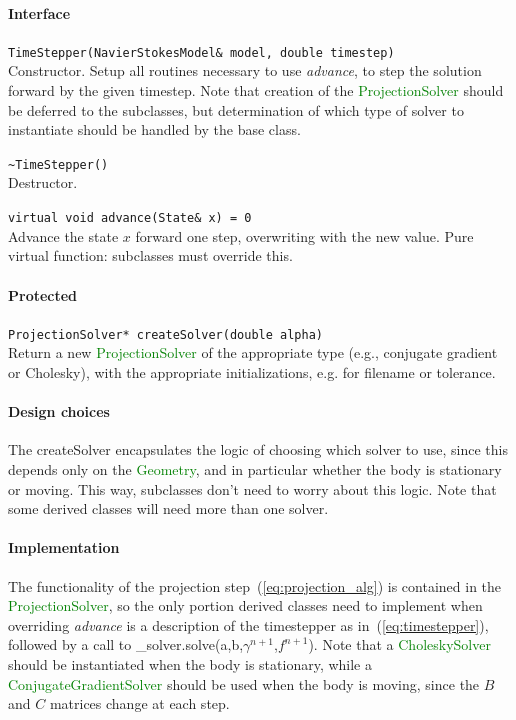 \documentclass[11pt]{article}
\def\class#1{\textcolor{green}{\ttfamily\small #1}} %
\def\fn#1{{\ttfamily\small #1}} %
\def\virtualfn#1{{\ttfamily\small\slshape #1}} %
\let\code\lstinline
\begin{document}
\paragraph{Interface}
\begin{description}
	\item \code|TimeStepper(NavierStokesModel& model, double timestep)|\\
		Constructor.  Setup all routines necessary to use \virtualfn{advance}, to step the solution forward by the given timestep.  Note that creation of the \class{ProjectionSolver} should be deferred to the subclasses, but determination of which type of solver to instantiate should be handled by the base class.
	\item \code|~TimeStepper()|\\
		Destructor.
	\item \code|virtual void advance(State& x) = 0|\\
	 	Advance the state $x$ forward one step, overwriting with the new value.  Pure virtual function: subclasses must override this.
\end{description}
\paragraph{Protected}
\begin{description}
	\item \code|ProjectionSolver* createSolver(double alpha)|\\
		Return a new \class{ProjectionSolver} of the appropriate type (e.g., conjugate gradient or Cholesky), with the appropriate initializations, e.g. for filename or tolerance.
	\end{description}

\paragraph{Design choices}
The \fn{createSolver} encapsulates the logic of choosing which solver to use, since this depends only on the \class{Geometry}, and in particular whether the body is stationary or moving.  This way, subclasses don't need to worry about this logic.  Note that some derived classes will need more than one solver.

\paragraph{Implementation}
The functionality of the projection step~(\ref{eq:projection_alg}) is contained in the \class{ProjectionSolver}, so the only portion derived classes need to implement when overriding \virtualfn{advance} is a description of the timestepper as in~(\ref{eq:timestepper}), followed by a call to \fn{\_solver.solve}(a,b,$\gamma^{n+1}$,$f^{n+1}$).  Note that a \class{CholeskySolver} should be instantiated when the body is stationary, while a \class{ConjugateGradientSolver} should be used when the body is moving, since the $B$ and $C$ matrices change at each step.
\end{document}
